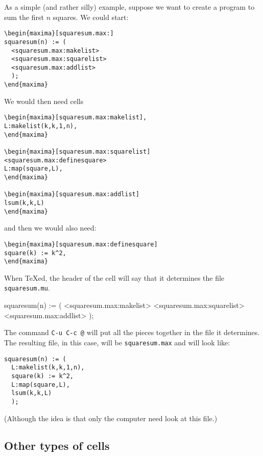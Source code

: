 \documentclass{article}
\begin{document}
As a simple (and rather silly) example, suppose we want to create a
program to sum the first $n$ squares.  We could start:
\begin{verbatim}
\begin{maxima}[squaresum.max:]
squaresum(n) := (
  <squaresum.max:makelist>
  <squaresum.max:squarelist>
  <squaresum.max:addlist>
  );        
\end{maxima}
\end{verbatim}
\noindent
We would then need cells
\begin{verbatim}
\begin{maxima}[squaresum.max:makelist],
L:makelist(k,k,1,n),
\end{maxima}

\begin{maxima}[squaresum.max:squarelist]
<squaresum.max:definesquare>
L:map(square,L),
\end{maxima}

\begin{maxima}[squaresum.max:addlist]
lsum(k,k,L)
\end{maxima}
\end{verbatim}
\noindent
and then we would also need:
\begin{verbatim}
\begin{maxima}[squaresum.max:definesquare]
square(k) := k^2,
\end{maxima}
\end{verbatim}
\noindent
When \TeX{}ed, the header of the cell will say that it determines the
file \texttt{squaresum.mu}.  
\begin{maxima}
squaresum(n) := (
  <squaresum.max:makelist>
  <squaresum.max:squarelist>
  <squaresum.max:addlist>
  );        
\end{maxima}

The command 
\texttt{C-u C-c @} will put all the pieces
together in the file it determines.  The resulting file, in this case,
will be \texttt{squaresum.max} and will look like:
\begin{verbatim}
squaresum(n) := (
  L:makelist(k,k,1,n),
  square(k) := k^2,
  L:map(square,L),
  lsum(k,k,L)
  );        
\end{verbatim}
\noindent
(Although the idea is that only the computer need look at this file.)

\subsection{Other types of cells}
\end{document}
